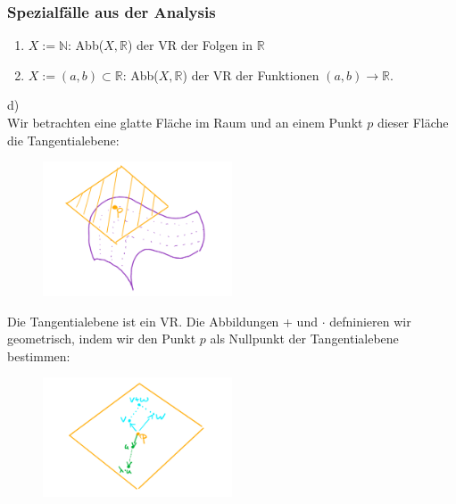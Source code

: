 \documentclass{article}
\begin{document}
\subsubsection*{Spezialfälle aus der Analysis}
\begin{enumerate}
    \item $X:= \mathbb{N}$: Abb($X, \mathbb{R}$) der VR der Folgen in $\mathbb{R}$
    \item $X:= (a,b) \subset \mathbb{R}$: Abb($X, \mathbb{R}$) der VR der Funktionen $(a,b) \rightarrow \mathbb{R}$.
\end{enumerate}

d) \\
Wir betrachten eine glatte Fläche im Raum und an einem Punkt $p$ dieser Fläche die Tangentialebene: \\

\begin{figure}[h]
    \centering
    \includegraphics[width=0.5\textwidth]{Images/4.2d.jpeg}
    \caption{}
\end{figure}
Die Tangentialebene ist ein VR. Die Abbildungen + und $\cdot$ defninieren wir geometrisch, indem wir den Punkt $p$ als Nullpunkt der Tangentialebene bestimmen: \\

\begin{figure}[h]
    \centering
    \includegraphics[width=0.5\textwidth]{Images/4.2d2.jpeg}
    \caption{}
\end{figure}
\end{document}
